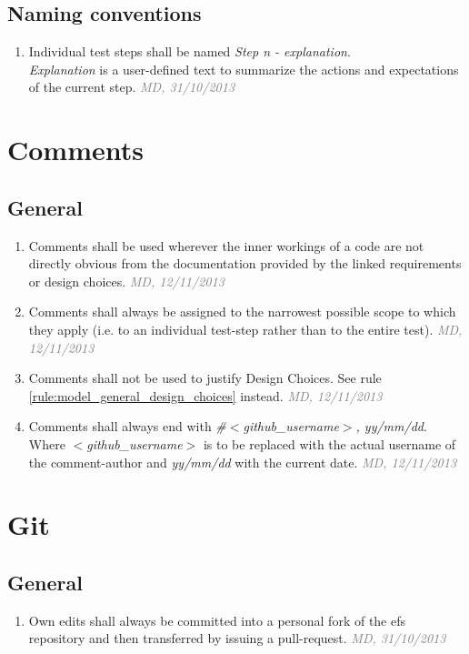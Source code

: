 \documentclass[draft, a4paper, oneside]{scrreprt}
\let\emph\textsl
\newcommand{\literally}[1]{\textsf{\emph{#1}}}
\newcommand{\ruleauthor}[2]{\mbox{}\newline\mbox{}\hfill{\footnotesize\textcolor{gray}{\emph{#1, #2}}}\xspace}}
\newcommand{\ruleauthor}[2]{}
\begin{document}
\section{Naming conventions}
\begin{enumerate}
\item Individual test steps shall be named \literally{Step n - explanation}.\\ \literally{Explanation} is a user-defined text to summarize the actions and expectations of the current step. \ruleauthor{MD}{31/10/2013}
\end{enumerate}


\chapter{Comments}

\section{General}
\begin{enumerate}
\item Comments shall be used wherever the inner workings of a code are not directly obvious from the documentation provided by the linked requirements or design choices. \ruleauthor{MD}{12/11/2013}
\item Comments shall always be assigned to the narrowest possible scope to which they apply (i.e. to an individual test-step rather than to the entire test). \ruleauthor{MD}{12/11/2013}
\item Comments shall not be used to justify Design Choices. See rule \ref{rule:model_general_design_choices} instead. \ruleauthor{MD}{12/11/2013}
\item Comments shall always end with \literally{\#$<$github_username$>$, yy/mm/dd}. Where \literally{$<$github_username$>$} is to be replaced with the actual username of the comment-author and \literally{yy/mm/dd} with the current date. \ruleauthor{MD}{12/11/2013}
\end{enumerate}


\chapter{Git}
\section{General}
\begin{enumerate}
\item Own edits shall always be committed into a personal fork of the \gls{efs} repository and then transferred by issuing a pull-request. \ruleauthor{MD}{31/10/2013}
\end{enumerate}
\end{document}

